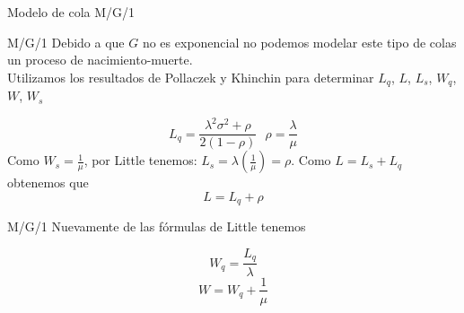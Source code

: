 \begin{frame}
	\centering \LARGE \color{naranjaUCA} Modelo de cola M/G/1
\end{frame}
\begin{frame}{M/G/1}
Debido a que $G$ no es exponencial no podemos modelar este tipo de colas un proceso de nacimiento-muerte. \\ \pause
Utilizamos los resultados de Pollaczek y Khinchin para determinar $L_q$, $L$, $L_s$, $W_q$, $W$, $W_s$ \pause


\begin{equation}
L_q=\frac{\lambda^2 \sigma^2+\rho}{2(1-\rho)} ~ ~ ~ \rho=\frac{\lambda}{\mu}
\end{equation}
Como $W_s=\displaystyle\frac{1}{\mu}$, por Little tenemos:
$L_s=\lambda\left(\displaystyle\frac{1}{\mu}\right)=\rho$. Como $L=L_s+L_q$ obtenemos que
\begin{equation}
L=L_q+\rho
\end{equation}


\end{frame}

\begin{frame}{M/G/1}
Nuevamente de las fórmulas de Little tenemos

$$
W_q=\frac{L_q}{\lambda}$$
$$
W=W_q+\frac{1}{\mu}
$$

\end{frame}